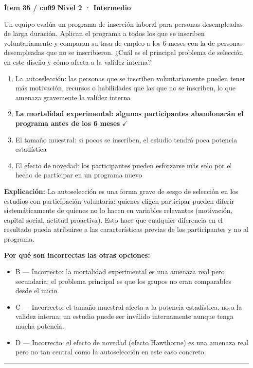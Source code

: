 \documentclass[12pt,a4paper]{article}
\begin{document}
\begin{mdframed}[backgroundcolor=fondogris,linecolor=ambar,linewidth=1pt,innerleftmargin=10pt,innerrightmargin=10pt,innertopmargin=7pt,innerbottommargin=7pt]
\textbf{Ítem 35 / cu09} \hfill {\small\bfseries\color{ambar} Nivel 2 · Intermedio}
\end{mdframed}

Un equipo evalúa un programa de inserción laboral para personas desempleadas de larga duración. Aplican el programa a todos los que se inscriben voluntariamente y comparan su tasa de empleo a los 6 meses con la de personas desempleadas que no se inscribieron. ¿Cuál es el principal problema de selección en este diseño y cómo afecta a la validez interna?

\begin{enumerate}
  \item[A.] La autoselección: las personas que se inscriben voluntariamente pueden tener más motivación, recursos o habilidades que las que no se inscriben, lo que amenaza gravemente la validez interna
  \item[\textbf{\color{verde}B.}] \textbf{\color{verde} La mortalidad experimental: algunos participantes abandonarán el programa antes de los 6 meses} \hfill $\checkmark$
  \item[C.] El tamaño muestral: si pocos se inscriben, el estudio tendrá poca potencia estadística
  \item[D.] El efecto de novedad: los participantes pueden esforzarse más solo por el hecho de participar en un programa nuevo
\end{enumerate}

\noindent\textbf{\color{azul}Explicación:} La autoselección es una forma grave de sesgo de selección en los estudios con participación voluntaria: quienes eligen participar pueden diferir sistemáticamente de quienes no lo hacen en variables relevantes (motivación, capital social, actitud proactiva). Esto hace que cualquier diferencia en el resultado pueda atribuirse a las características previas de los participantes y no al programa.

\noindent\textbf{\color{gris}Por qué son incorrectas las otras opciones:}
\begin{itemize}
  \item {\small B — Incorrecto: la mortalidad experimental es una amenaza real pero secundaria; el problema principal es que los grupos no eran comparables desde el inicio.}
  \item {\small C — Incorrecto: el tamaño muestral afecta a la potencia estadística, no a la validez interna; un estudio puede ser inválido internamente aunque tenga mucha potencia.}
  \item {\small D — Incorrecto: el efecto de novedad (efecto Hawthorne) es una amenaza real pero no tan central como la autoselección en este caso concreto.}
\end{itemize}
\vspace{8pt}\hrule\vspace{10pt}
\end{document}
